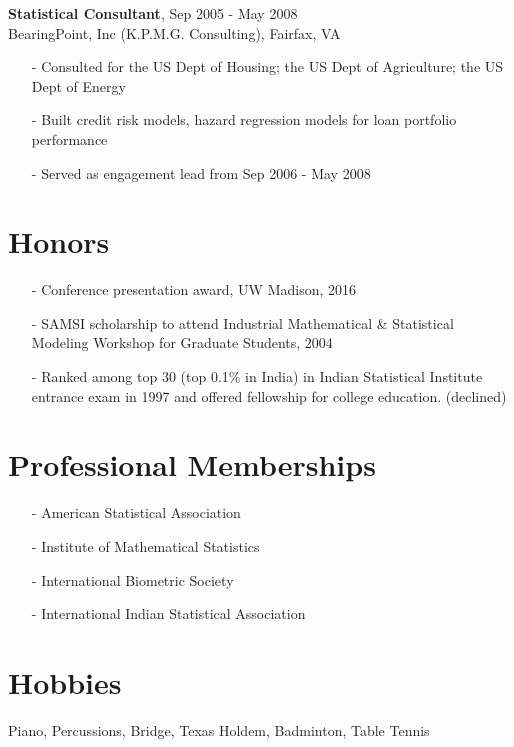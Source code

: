 \documentclass[11pt]{res} %
\begin{document}
\begin{resume}
{\bf{Statistical Consultant}}, \hfill Sep 2005 - May 2008 \\
BearingPoint, Inc (K.P.M.G. Consulting), Fairfax, VA
   \begin{itemize}[leftmargin=*] \itemsep -2pt %
   \item[-] Consulted for the US Dept of Housing; the US Dept of Agriculture; the US Dept of Energy
   \item[-] Built credit risk models, hazard regression models for loan portfolio performance
   \item[-] Served as engagement lead from Sep 2006 - May 2008
   \end{itemize}

\section{Honors} 
\begin{itemize}[leftmargin=*] \itemsep -2pt
\item[-] Conference presentation award, UW Madison, 2016
\item[-] SAMSI scholarship to attend Industrial Mathematical \& Statistical Modeling Workshop for Graduate Students, 2004
\item[-] Ranked among top 30 (top 0.1\% in India) in Indian Statistical Institute entrance exam in 1997 and offered fellowship for college education. (declined)
\end{itemize}

\section{Professional Memberships}
\begin{itemize}[leftmargin=*] \itemsep -2pt
\item[-] American Statistical Association
\item[-] Institute of Mathematical Statistics
\item[-] International Biometric Society
\item[-] International Indian Statistical Association 
\end{itemize}

\section{Hobbies} 
Piano, Percussions, Bridge, Texas Holdem, Badminton, Table Tennis
 
\end{resume}
\end{document}
